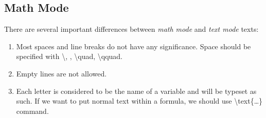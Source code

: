 \documentclass[10pt, a4paper]{article}
\begin{document}
\subsection{Math Mode}
There are several important differences between \emph{math mode} and \emph{text mode} texts:
\begin{enumerate}
\item Most spaces and line breaks do not have any significance. Space should be specified with \textbackslash, , \textbackslash quad, \textbackslash qquad.
\item Empty lines are not allowed.
\item Each letter is considered to be the name of a variable and will be typeset as such. If we want to put normal text within a formula, we should use \textbackslash text\{\ldots\} command.
\end{enumerate}
\end{document}
